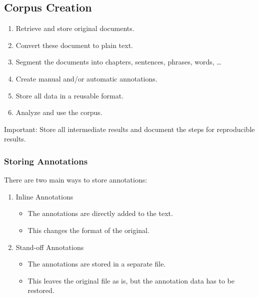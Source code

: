         \subsection{Corpus Creation} %
            \begin{enumerate}
            	\item Retrieve and store original documents.
            	\item Convert these document to plain text.
            	\item Segment the documents into chapters, sentences, phrases, words, \dots
            	\item Create manual and/or automatic annotations.
            	\item Store all data in a reusable format.
            	\item Analyze and use the corpus.
            \end{enumerate}
        	Important: Store all intermediate results and document the steps for reproducible results.

            \subsubsection{Storing Annotations} %
                There are two main ways to store annotations:
                \begin{enumerate}
                	\item Inline Annotations
                		\begin{itemize}
                			\item The annotations are directly added to the text.
                			\item This changes the format of the original.
                		\end{itemize}
                	\item Stand-off Annotations
                		\begin{itemize}
                			\item The annotations are stored in a separate file.
                			\item This leaves the original file as is, but the annotation data has to be restored.
                		\end{itemize}
                \end{enumerate}

